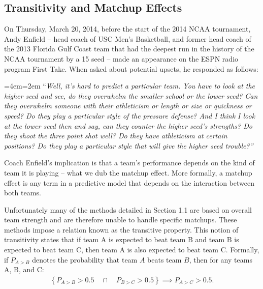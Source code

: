 \documentclass[letterpaper,12pt]{article}
\newenvironment{blockquote}{%
  \par%
  \medskip
  \leftskip=4em\rightskip=2em%
  \noindent\ignorespaces}{%
  \par\medskip}
\begin{document}
\subsection{Transitivity and Matchup Effects}
On Thursday, March 20, 2014, before the start of the 2014 NCAA tournament, Andy Enfield -- head coach of USC Men's Basketball, and former head coach of the 2013 Florida Gulf Coast team that had the deepest run in the history of the NCAA tournament by a 15 seed -- made an appearance on the ESPN radio program First Take. When asked about potential upsets, he responded as follows:
\begin{blockquote}
``\emph{Well, it's hard to predict a particular team. You have to look at the higher seed and see, do they overwhelm the smaller school or the lower seed? Can they overwhelm someone with their athleticism or length or size or quickness or speed? Do they play a particular style of the pressure defense? And I think I look at the lower seed then and say, can they counter the higher seed's strengths? Do they shoot the three point shot well? Do they have athleticism at certain positions? Do they play a particular style that will give the higher seed trouble?''}
\end{blockquote}
%
\noindent Coach Enfield's implication is that a team's performance depends on the kind of team it is playing -- what we dub the matchup effect. More formally, a matchup effect is any term in a predictive model that depends on the interaction between both teams. 

Unfortunately many of the methods detailed in Section 1.1 are based on overall team strength and are therefore unable to handle specific matchups. These methods impose a relation known as the transitive property. This notion of transitivity states that if team A is expected to beat team B and team B is expected to beat team C, then team A is also expected to beat team C. Formally, if $P_{A>B}$ denotes the probability that team $A$ beats team $B$, then for any teams A, B, and C: 
\begin{eqnarray*}
\left \{P_{A>B} > 0.5 \quad \cap \quad P_{B>C} > 0.5 \right\} \implies P_{A>C} > 0.5.
\label{eq:trans}
\end{eqnarray*}
\end{document}

